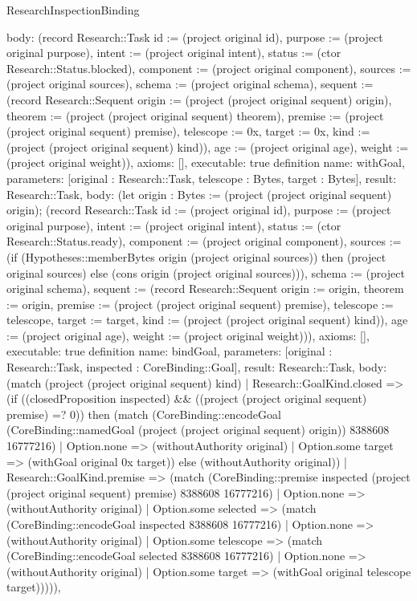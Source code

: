 \begin{lexlean}{ResearchInspectionBinding}
\begin{semanticmodule}
{ body: (record Research::Task {id := (project original id), purpose := (project original purpose), intent := (project original intent), status := (ctor Research::Status.blocked), component := (project original component), sources := (project original sources), schema := (project original schema), sequent := (record Research::Sequent {origin := (project (project original sequent) origin), theorem := (project (project original sequent) theorem), premise := (project (project original sequent) premise), telescope := 0x, target := 0x, kind := (project (project original sequent) kind)}), age := (project original age), weight := (project original weight)}),
 axioms: [],
 executable: true
}
definition{
 name: withGoal,
 parameters: [original : Research::Task, telescope : Bytes, target : Bytes],
 result: Research::Task,
 body: (let origin : Bytes := (project (project original sequent) origin); (record Research::Task {id := (project original id), purpose := (project original purpose), intent := (project original intent), status := (ctor Research::Status.ready), component := (project original component), sources := (if (Hypotheses::memberBytes origin (project original sources)) then (project original sources) else (cons origin (project original sources))), schema := (project original schema), sequent := (record Research::Sequent {origin := origin, theorem := origin, premise := (project (project original sequent) premise), telescope := telescope, target := target, kind := (project (project original sequent) kind)}), age := (project original age), weight := (project original weight)})),
 axioms: [],
 executable: true
}
definition{
 name: bindGoal,
 parameters: [original : Research::Task, inspected : CoreBinding::Goal],
 result: Research::Task,
 body: (match (project (project original sequent) kind) | Research::GoalKind.closed => (if ((closedProposition inspected) && ((project (project original sequent) premise) =? 0)) then (match (CoreBinding::encodeGoal (CoreBinding::namedGoal (project (project original sequent) origin)) 8388608 16777216) | Option.none => (withoutAuthority original) | Option.some target => (withGoal original 0x target)) else (withoutAuthority original)) | Research::GoalKind.premise => (match (CoreBinding::premise inspected (project (project original sequent) premise) 8388608 16777216) | Option.none => (withoutAuthority original) | Option.some selected => (match (CoreBinding::encodeGoal inspected 8388608 16777216) | Option.none => (withoutAuthority original) | Option.some telescope => (match (CoreBinding::encodeGoal selected 8388608 16777216) | Option.none => (withoutAuthority original) | Option.some target => (withGoal original telescope target))))),
}
\end{semanticmodule}
\end{lexlean}
